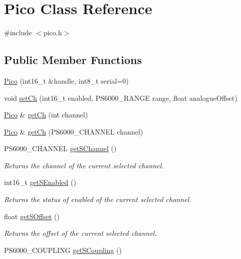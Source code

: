 \hypertarget{classPico}{}\section{Pico Class Reference}
\label{classPico}


{\ttfamily \#include $<$pico.\+h$>$}

\subsection*{Public Member Functions}
\begin{DoxyCompactItemize}
\item 
\hyperlink{classPico_abd3b0e4368cc0178e232096bf6f0a4f7}{Pico} (int16\+\_\+t \&handle, int8\+\_\+t serial=0)
\item 
void \hyperlink{classPico_a6b128995e25dd9386ac1992ff7ffee90}{set\+Ch} (int16\+\_\+t enabled, P\+S6000\+\_\+\+R\+A\+N\+GE range, float analogue\+Offset)
\item 
\hyperlink{classPico}{Pico} \& \hyperlink{classPico_a2879db63358ab7de1c996bd4e337850d}{get\+Ch} (int channel)
\item 
\hyperlink{classPico}{Pico} \& \hyperlink{classPico_a85b8da23d9b654297e8ace9523e7f975}{get\+Ch} (P\+S6000\+\_\+\+C\+H\+A\+N\+N\+EL channel)
\item 
P\+S6000\+\_\+\+C\+H\+A\+N\+N\+EL \hyperlink{classPico_a02caf6b240668b4bf91571e96b073567}{get\+S\+Channel} ()
\begin{DoxyCompactList}\small\item\em Returns the channel of the current selected channel. \end{DoxyCompactList}\item 
int16\+\_\+t \hyperlink{classPico_aab47665be6477eb5d20d24ea68b8908e}{get\+S\+Enabled} ()
\begin{DoxyCompactList}\small\item\em Returns the status of enabled of the current selected channel. \end{DoxyCompactList}\item 
float \hyperlink{classPico_a9af51bcf9bade893ecbf9b103b86dc6b}{get\+S\+Offset} ()
\begin{DoxyCompactList}\small\item\em Returns the offset of the current selected channel. \end{DoxyCompactList}\item 
P\+S6000\+\_\+\+C\+O\+U\+P\+L\+I\+NG \hyperlink{classPico_a0d8480b9774b65995a0ce0522ac721f9}{get\+S\+Coupling} ()

\end{DoxyCompactItemize}

